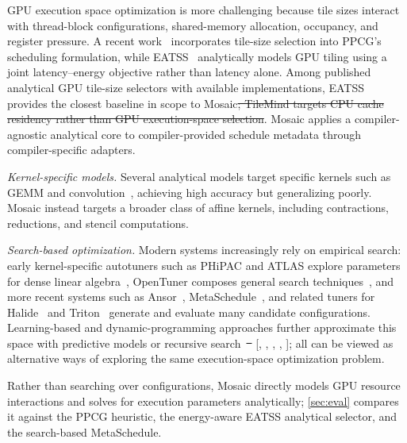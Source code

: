 \documentclass[acmsmall,review,anonymous,screen]{acmart}
\makeatletter
\newif\ifrevmarkup %
\DeclareRobustCommand{\revO}[1]{\ifrevmarkup{\color{revO}\hypersetup{allcolors=revO}#1}\else#1\fi} %
\DeclareRobustCommand{\revRone}[1]{\ifrevmarkup{\color{revRone}\hypersetup{allcolors=revRone}#1}\else#1\fi} %
\let\revO\@firstofone\let\revRone\@firstofone %
\newcommand{\name}{{Mosaic}\xspace}
\providecommand{\DIFdel}[1]{{\protect\color{red}\sout{#1}}}                      %
\providecommand{\DIFaddbegin}{} %
\providecommand{\DIFaddend}{} %
\providecommand{\DIFdelbegin}{} %
\providecommand{\DIFdelend}{} %
\newcommand{\DIFscaledelfig}{0.5}
\newlength{\DIFdelgraphicswidth} %
\newlength{\DIFdelgraphicsheight} %
\newcommand{\DIFaddincludegraphics}[2][]{{\color{blue}\fbox{\DIFOincludegraphics[#1]{#2}}}} %
\newcommand{\DIFdelincludegraphics}[2][]{%
\sbox{\DIFdelgraphicsbox}{\DIFOincludegraphics[#1]{#2}}%
\settoboxwidth{\DIFdelgraphicswidth}{\DIFdelgraphicsbox} %
\settoboxtotalheight{\DIFdelgraphicsheight}{\DIFdelgraphicsbox} %
\scalebox{\DIFscaledelfig}{%
\parbox[b]{\DIFdelgraphicswidth}{\usebox{\DIFdelgraphicsbox}\\[-\baselineskip] \rule{\DIFdelgraphicswidth}{0em}}\llap{\resizebox{\DIFdelgraphicswidth}{\DIFdelgraphicsheight}{%
\setlength{\unitlength}{\DIFdelgraphicswidth}%
\begin{picture}(1,1)%
\thicklines\linethickness{2pt} %
{\color[rgb]{1,0,0}\put(0,0){\framebox(1,1){}}}%
{\color[rgb]{1,0,0}\put(0,0){\line( 1,1){1}}}%
{\color[rgb]{1,0,0}\put(0,1){\line(1,-1){1}}}%
\end{picture}%
}\hspace*{3pt}}} %
} %
\DeclareRobustCommand{\DIFaddbegin}{\DIFOaddbegin \let\includegraphics\DIFaddincludegraphics} %
\DeclareRobustCommand{\DIFaddend}{\DIFOaddend \let\includegraphics\DIFOincludegraphics} %
\DeclareRobustCommand{\DIFdelbegin}{\DIFOdelbegin \let\includegraphics\DIFdelincludegraphics} %
\DeclareRobustCommand{\DIFdelend}{\DIFOaddend \let\includegraphics\DIFOincludegraphics} %
\makeatother
\begin{document}
\DIFaddend GPU execution space optimization is more challenging because tile sizes interact with thread-block configurations, shared-memory allocation, occupancy, and register pressure. A recent work~\cite{ppcg-tss} incorporates tile-size selection into PPCG's scheduling formulation, while EATSS~\cite{eatss} analytically models GPU tiling using a joint latency--energy objective rather than latency alone. Among published analytical GPU tile-size selectors with available implementations, EATSS provides the closest baseline in scope to \name\DIFdelbegin \DIFdel{; TileMind targets CPU cache residency rather than GPU execution-space selection}\DIFdelend . \name applies a compiler-agnostic analytical core to compiler-provided schedule metadata through compiler-specific adapters.

\par\noindent\hspace*{\parindent}\textit{Kernel-specific models.} Several analytical models target specific kernels such as GEMM and convolution~\cite{anatomy,li-gemm,blis,saday-conv,conv-cache}, achieving high accuracy but generalizing poorly. \name instead targets a broader class of affine kernels, including contractions, reductions, and stencil computations.

\par\noindent\hspace*{\parindent}\textit{Search-based optimization.} Modern systems increasingly rely on empirical search: early kernel-specific autotuners such as PHiPAC and ATLAS explore parameters for dense linear algebra~\cite{phipac,atlas}, OpenTuner composes general search techniques~\cite{opentuner}, and more recent systems such as Ansor~\cite{ansor}, MetaSchedule~\cite{metaschedule}, and related tuners for Halide~\cite{automatichalide} and Triton~\cite{triton} generate and evaluate many candidate configurations. Learning-based and dynamic-programming approaches further approximate this space with predictive models or recursive search~\DIFdelbegin \DIFdel{\mbox{%
\cite{hctuner,yuki-tss,Jangda2020dp,shirako-tss}}\hspace{0pt}%
}\DIFdelend \DIFaddbegin {\hypersetup{citecolor=black}[, , , , \revO{\citenum{zhai2024tlm}}]}\DIFaddend ; all can be viewed as alternative ways of exploring the same execution-space optimization problem.

Rather than searching over configurations, \name directly models GPU resource interactions and solves for execution parameters analytically; \autoref{sec:eval} compares it against the PPCG heuristic, the energy-aware EATSS analytical selector, and the search-based MetaSchedule.
\end{document}
